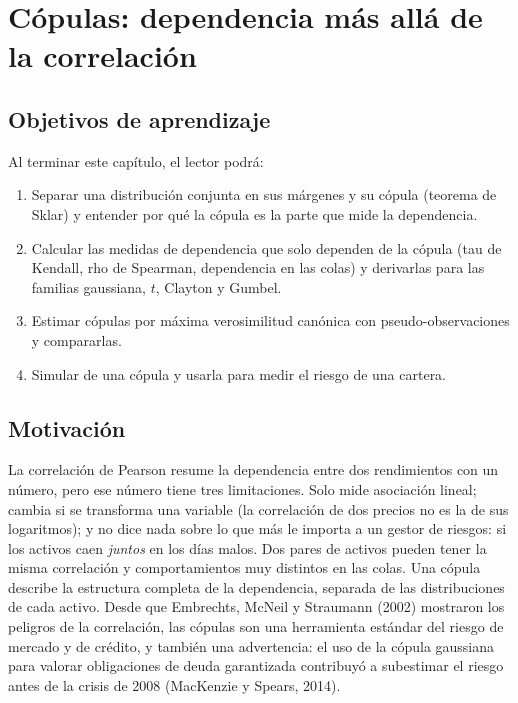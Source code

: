 \chapter[Cópulas]{Cópulas: dependencia más allá de la correlación}\label{cap:copulas}

\section*{Objetivos de aprendizaje}
Al terminar este capítulo, el lector podrá:
\begin{enumerate}[label=\arabic*.,leftmargin=*]
  \item Separar una distribución conjunta en sus márgenes y su cópula (teorema de Sklar) y entender por qué la
        cópula es la parte que mide la dependencia.
  \item Calcular las medidas de dependencia que solo dependen de la cópula (tau de Kendall, rho de Spearman,
        dependencia en las colas) y derivarlas para las familias gaussiana, $t$, Clayton y Gumbel.
  \item Estimar cópulas por máxima verosimilitud canónica con pseudo-observaciones y compararlas.
  \item Simular de una cópula y usarla para medir el riesgo de una cartera.
\end{enumerate}

\section*{Motivación}
La correlación de Pearson resume la dependencia entre dos rendimientos con un número, pero ese número tiene tres
limitaciones. Solo mide asociación lineal; cambia si se transforma una variable (la correlación de dos precios no es la
de sus logaritmos); y no dice nada sobre lo que más le importa a un gestor de riesgos: si los activos caen \emph{juntos}
en los días malos. Dos pares de activos pueden tener la misma correlación y comportamientos muy distintos en las colas.
Una cópula describe la estructura completa de la dependencia, separada de las distribuciones de cada activo. Desde
que Embrechts, McNeil y Straumann (2002) mostraron los peligros de la correlación, las cópulas son una herramienta
estándar del riesgo de mercado y de crédito, y también una advertencia: el uso de la cópula gaussiana para valorar
obligaciones de deuda garantizada contribuyó a subestimar el riesgo antes de la crisis de 2008 (MacKenzie y Spears, 2014).

